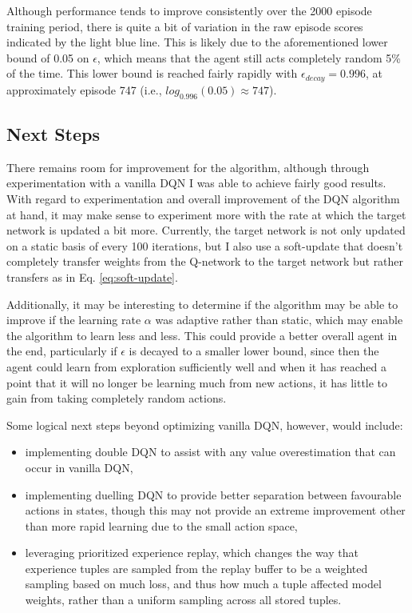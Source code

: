 \documentclass[11pt]{article}
\begin{document}
Although performance tends to improve consistently over the 2000 episode training period, there is quite a bit of variation in the raw episode scores indicated by the light blue line. This is likely due to the aforementioned lower bound of 0.05 on $\epsilon$, which means that the agent still acts completely random 5\% of the time. This lower bound is reached fairly rapidly with $\epsilon_{decay}=0.996$, at approximately episode 747 (i.e., $log_{0.996}(0.05) \approx 747$).

\subsection{Next Steps}


There remains room for improvement for the algorithm, although through experimentation with a vanilla DQN I was able to achieve fairly good results. With regard to experimentation and overall improvement of the DQN algorithm at hand, it may make sense to experiment more with the rate at which the target network is updated a bit more. Currently, the target network is not only updated on a static basis of every 100 iterations, but I also use a soft-update that doesn't completely transfer weights from the Q-network to the target network but rather transfers as in Eq. \ref{eq:soft-update}.

Additionally, it may be interesting to determine if the algorithm may be able to improve if the learning rate $\alpha$ was adaptive rather than static, which may enable the algorithm to learn less and less. This could provide a better overall agent in the end, particularly if $\epsilon$ is decayed to a smaller lower bound, since then the agent could learn from exploration sufficiently well and when it has reached a point that it will no longer be learning much from new actions, it has little to gain from taking completely random actions.

Some logical next steps beyond optimizing vanilla DQN, however, would include:
\begin{itemize}
\item implementing double DQN to assist with any value overestimation that can occur in vanilla DQN,
\item implementing duelling DQN to provide better separation between favourable actions in states, though this may not provide an extreme improvement other than more rapid learning due to the small action space,
\item leveraging prioritized experience replay, which changes the way that experience tuples are sampled from the replay buffer to be a weighted sampling based on much loss, and thus how much a tuple affected model weights, rather than a uniform sampling across all stored tuples.
\end{itemize}
\end{document}
